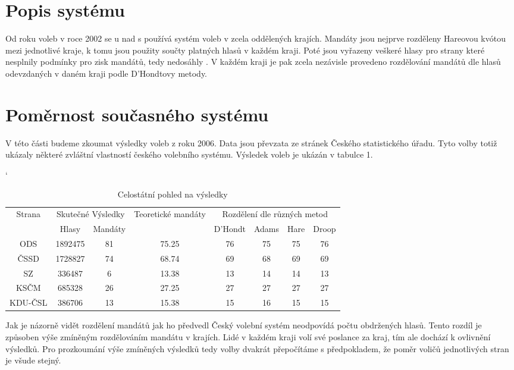 \documentclass[12pt]{report}
\begin{document}
\section{Popis systému} Od roku voleb v roce 2002 se u nad s používá systém voleb v zcela oddělených krajích.
Mandáty jsou nejprve rozděleny Hareovou kvótou mezi jednotlivé kraje, k tomu jsou použity součty platných hlasů v každém kraji.
Poté jsou vyřazeny veškeré hlasy pro strany které nesplnily podmínky pro zisk mandátů, tedy nedosáhly .
V každém kraji je pak zcela nezávisle provedeno rozdělování mandátů dle hlasů odevzdaných v daném kraji podle D'Hondtovy metody.
\section{Poměrnost současného systému} V této části budeme zkoumat výsledky voleb z roku 2006.
Data jsou převzata ze stránek Českého statistického úřadu.\autocite{CSU} Tyto volby totiž ukázaly některé zvláštní vlastností českého volebního systému.
Výsledek voleb je ukázán v tabulce 1.
\begin{table}[p]
\catcode`
\begin{tabular}{|c|c|c|c|c|c|c|c|} \hline \multirow{2}{*}{Strana} & \multicolumn{2}{|c|}{Skutečné Výsledky} & \multirow{2}{*}{Teoretické mandáty} & \multicolumn{4}{|c|}{Rozdělení dle různých metod} \\
\cline{2-3} \cline{5-8} & Hlasy & Mandáty & & D'Hondt & Adams & Hare & Droop \\
\hline ODS & 1892475 & 81 & 75.25 & 76 & 75 & 75 & 76 \\
\hline ČSSD & 1728827 & 74 & 68.74 & 69 & 68 & 69 & 69 \\
\hline SZ & 336487 & 6 & 13.38 & 13 & 14 & 14 & 13 \\
\hline KSČM & 685328 & 26 & 27.25 & 27 & 27 & 27 & 27 \\
\hline KDU-ČSL & 386706 & 13 & 15.38 & 15 & 16 & 15 & 15 \\
\hline \end{tabular} \caption{Celostátní pohled na výsledky} \end{table} Jak je názorně vidět rozdělení mandátů jak ho předvedl Český volební systém neodpovídá počtu obdržených hlasů.
Tento rozdíl je způsoben výše zmíněným rozdělováním mandátu v krajích.
Lidé v každém kraji volí své poslance  za kraj, tím ale dochází k ovlivnění výsledků.
Pro prozkoumání výše zmíněných výsledků tedy volby dvakrát přepočítáme s předpokladem, že poměr voličů jednotlivých stran je všude stejný.
\end{document}
